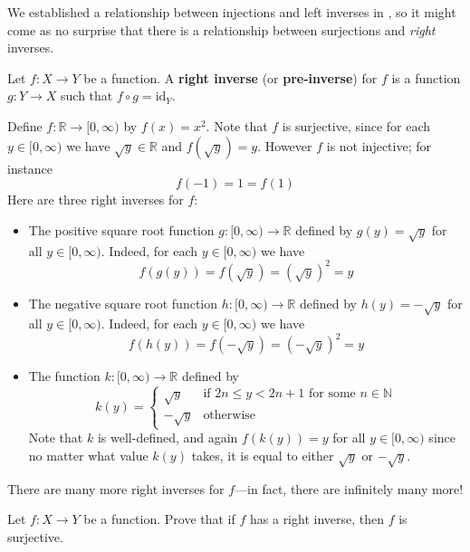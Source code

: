 We established a relationship between injections and left inverses in , so it might come as no surprise that there is a relationship between surjections and \textit{right} inverses.

\begin{definition}
\label{defRightInverse}
Let $f : X \to Y$ be a function. A \textbf{right inverse} (or \textbf{pre-inverse}) for $f$ is a function $g : Y \to X$ such that $f \circ g = \mathrm{id}_Y$.
\end{definition}

\begin{example}
Define $f : \mathbb{R} \to [0,\infty)$ by $f(x)=x^2$. Note that $f$ is surjective, since for each $y \in [0,\infty)$ we have $\sqrt{y} \in \mathbb{R}$ and $f(\sqrt{y}) = y$. However $f$ is not injective; for instance
\[ f(-1) = 1 = f(1) \]
Here are three right inverses for $f$:
\begin{itemize}
\item The positive square root function $g : [0,\infty) \to \mathbb{R}$ defined by $g(y)=\sqrt{y}$ for all $y \in [0,\infty)$. Indeed, for each $y \in [0,\infty)$ we have
\[ f(g(y)) = f(\sqrt{y}) = (\sqrt{y})^2 = y \]
\item The negative square root function $h : [0,\infty) \to \mathbb{R}$ defined by $h(y)=-\sqrt{y}$ for all $y \in [0,\infty)$. Indeed, for each $y \in [0,\infty)$ we have
\[ f(h(y)) = f(-\sqrt{y}) = (-\sqrt{y})^2 = y \]
\item The function $k : [0,\infty) \to \mathbb{R}$ defined by
\[ k(y) = \begin{cases}
\sqrt{y} & \text{if } 2n \le y < 2n+1 \text{ for some } n \in \mathbb{N} \\
-\sqrt{y} & \text{otherwise}
\end{cases} \]
Note that $k$ is well-defined, and again $f(k(y)) = y$ for all $y \in [0,\infty)$ since no matter what value $k(y)$ takes, it is equal to either $\sqrt{y}$ or $-\sqrt{y}$.
\end{itemize}
There are many more right inverses for $f$---in fact, there are infinitely many more!
\end{example}

\begin{exercise}
Let $f : X \to Y$ be a function. Prove that if $f$ has a right inverse, then $f$ is surjective.
\end{exercise}

